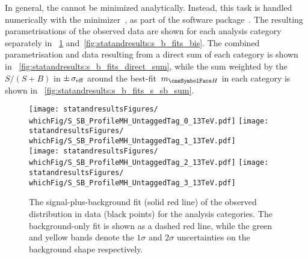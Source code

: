  In general, the \NLL cannot be minimized analytically. Instead, this task is handled numerically with the \Minuit minimizer~\cite{minuit}, as part of the \RooFit software package~\cite{RooFit}. 
The resulting parametrisations of the observed data are shown for each analysis category separately in \Fig\s~\ref{fig:statandresults:s_b_fits} and~\ref{fig:statandresults:s_b_fits_bis}. The combined parametrisation and data resulting from a direct sum of each category is shown in \Fig~\ref{fig:statandresults:s_b_fits_direct_sum}, while the sum weighted by the $S/(S+B)$ in $\pm \,\sigma_{\text{eff}}$ around the best-fit $\mH$ in each category is shown in \Fig~\ref{fig:statandresults:s_b_fits_s_sb_sum}. 

\begin{figure}[p]
\centering
\texttt{[image: statandresultsFigures/\\whichFig/S\_SB\_ProfileMH\_UntaggedTag\_0\_13TeV.pdf]} 
\texttt{[image: statandresultsFigures/\\whichFig/S\_SB\_ProfileMH\_UntaggedTag\_1\_13TeV.pdf]}\\ 
\texttt{[image: statandresultsFigures/\\whichFig/S\_SB\_ProfileMH\_UntaggedTag\_2\_13TeV.pdf]} 
\texttt{[image: statandresultsFigures/\\whichFig/S\_SB\_ProfileMH\_UntaggedTag\_3\_13TeV.pdf]} \\
\caption{The signal-plus-background fit (solid red line) of the observed \mgg distribution in data (black points) for the \Untagged analysis categories. The background-only fit is shown as a dashed red line, while the green and yellow bands denote the $1\sigma$ and $2\sigma$ uncertainties on the background shape respectively.}

\label{fig:statandresults:s_b_fits}
\end{figure}


